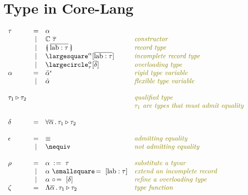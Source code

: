 \documentclass[11pt,a4paper]{article}
\newcommand{\nbkey}[1]{\textrm{#1}}
\newcommand{\record}[1]{\{\!\!\shortmid #1 \shortmid\!\!\}}
\newcommand{\overld}[3]{\largecircle^{#1}_{#2}{#3}}
\newcommand{\irecrd}[2]{\largesquare^{#1}{#2}}
\newcommand{\tyvarsubst}[2]{#1\ \hspace{-0.2ex}:\hspace{1pt}=\ #2}
\newcommand{\ovldrefine}[2]{#1\ \circ\hspace{-0.3ex}=\ #2}
\newcommand{\irecextend}[2]{#1\ \smallsquare\hspace{-0.3ex}=\ #2}
\newcommand{\lab}{\nbkey{lab}}
\newcommand{\rigdvar}[1]{\ddot{#1}}
\newcommand{\flexvar}[1]{\tilde#1}
\newcommand{\comment}[1]{\textit{\color{olive}#1}}
\newcommand{\tycon}{\mathbb{C}}
\newcommand{\tyfun}{\zeta}
\newcommand{\type}{\tau}
\newcommand{\qualtype}[2]{#1 \triangleright #2}
\newcommand{\scheme}{\delta}
\newcommand{\substitute}{\rho}
\newcommand{\equality}{\epsilon}
\newcommand{\eqyes}{\equiv}
\newcommand{\eqnot}{\nequiv}
\begin{document}
\section{Type in Core-Lang}
{\renewcommand{\arraystretch}{1.2}\[
\begin{array}{lcll}
\type
     & = & \alpha                                           & \\
     & | & \tycon\ \overline\type              	            &\comment{constructor}\\
     & | & \record{\overline{\lab:\type}}       		    &\comment{record type}\\
     & | & \irecrd{\alpha}{[\overline{\lab:\type}]}         &\comment{incomplete record type}\\
     & | & \overld{\alpha}{\type}{[\overline\scheme]}     	&\comment{overloading type}\\
\alpha 
     & = & \rigdvar{\alpha}^{\equality}                     &\comment{rigid type variable}\\
     & | & \flexvar{\alpha}                                 &\comment{flexible type variable}\\     
\\
\qualtype{\type_1}{\type_2} & &                             &\comment{qualified type} \\
                            & &                             &\comment{$\type_1$ are types that must admit equality} \\
\\     
\scheme 
     & = & \forall \overline{\alpha}\,.\,\qualtype{\type_1}{\type_2}
                                                            &\\
\\
\equality
	& = & \eqyes	& \comment{admitting equality}     \\
	& | & \eqnot	& \comment{not admitting equality} \\
\\
\substitute
     & = & \tyvarsubst{\alpha}{\type}                   	&\comment{substitute a tyvar}\\
     & | & \irecextend{\alpha}{[\lab:\type]}	     	    &\comment{extend an incomplete record}\\
     & | & \ovldrefine{\alpha}{[\scheme]}               	&\comment{refine a overloading type}\\

\tyfun
     & = & \Lambda{\overline{\alpha}}\,.\,{\qualtype{\type_1}{\type_2}} 
                                                            &\comment{type function}\\
\end{array}
\]}
\end{document}

